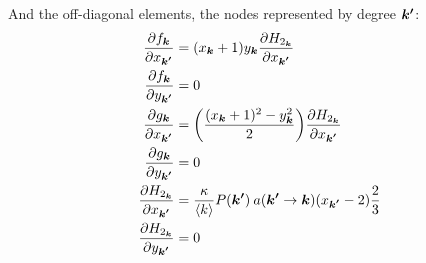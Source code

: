And the off-diagonal elements, the nodes represented by degree ${\boldsymbol{k'}}$:
\begin{align*}
\frac{\partial f_{\k}}{\partial x_{\kacc}} &= (x_{\k}+1) y_{\k} \frac{\partial H_{2_{\k}}}{\partial x_{\kacc}}\\
\frac{\partial f_{\k}}{\partial y_{\kacc}} &= 0 \\
\frac{\partial g_{\k}}{\partial x_{\kacc}} &= \left( \frac{(x_{\k} + 1)^2 - y_{\k}^2}{2} \right) \frac{\partial H_{2_{\k}}}{\partial x_{\kacc}} \\
\frac{\partial g_{\k}}{\partial y_{\kacc}} &= 0\\
\frac{\partial H_{2_{\k}}}{\partial x_{\kacc}} &= \frac{\kappa}{\langle k\rangle} P\left(\kacc\right) \: a\left(\kacc \rightarrow \k\right)(x_{\kacc}-2) \frac{2}{3} \\
\frac{\partial H_{2_{\k}}}{\partial y_{\kacc}} &= 0
\end{align*}


\label{LastPage}~





